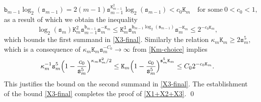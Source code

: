\documentclass[12pt, twoside]{article}
\def\red{\color{red}}
\theoremstyle{definition}
\numberwithin{equation}{section}
\begin{document}
\[ \mathtt b_{m-1} \log_2 (\mathtt s_{m-1}) = 2(m-1) \mathtt s_{m-1}^{\mathtt K_{m-1}^2} \log_2 (\mathtt s_{m-1})  < c_0 \mathtt K_m\quad\text{for some}\ 0<{c_0}<1, \]
as a result of which we obtain the inequality 
\begin{equation} \label{X3-verification-1} 
\log_2(\mathtt s_m) \mathtt K_m^2 \mathtt s_{m-1}^{\mathtt b_{m-1}} \mathtt s_m^{-\mathtt K_m} \leq \mathtt K_m^3  \mathtt s_{m}^{\mathtt b_{m-1} \log_2 (\mathtt s_{m-1}) } \mathtt s_m^{-\mathtt K_m} \leq 2^{-c_0 \mathtt K_m},
\end{equation} 
which bounds the first summand in \eqref{X3-final}. Similarly the relation $\kappa_m \mathtt K_m \geq 2\mathtt s_m^5$, which is a consequence of $\kappa_m \mathtt K_m \mathtt s_m^{-C_0} \rightarrow \infty$ from \eqref{Km-choice} implies 
\begin{equation} 
\kappa_m^{-1} \mathtt s_m^5 \Bigl(1 - \frac{c_0}{\mathtt s_m^5}\Bigr)^{\kappa_m \mathtt K_m^2/2} \leq \mathtt K_m \Bigl(1 - \frac{c_0}{\mathtt s_m^5}\Bigr)^{\mathtt s_m^5 \mathtt K_m} \leq {C_0}2^{-c_0 \mathtt K_m}. 
\label{X3-verification-2}
\end{equation}
This justifies the bound on the second summand in \eqref{X3-final}. The establishment of the bound \eqref{X3-final} completes the proof of \eqref{X1+X2+X3}. 
\qed 

\end{document}
